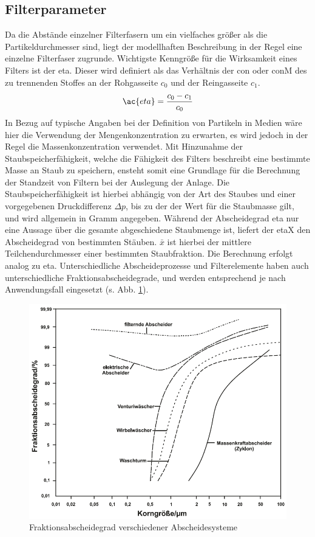 \subsection{Filterparameter}
Da die Abstände einzelner Filterfasern um ein vielfaches größer als die Partikeldurchmesser sind, liegt der modellhaften Beschreibung in der Regel eine einzelne Filterfaser zugrunde.
Wichtigste Kenngröße für die Wirksamkeit eines Filters ist der \ac{eta}.  Dieser wird definiert als das Verhältnis der \ac{con} oder \ac{conM} des zu trennenden Stoffes an der Rohgasseite $c_0$ und der Reingasseite $c_1$.\cite{Staubabscheidung}
\[
\ac{eta} = \frac{c_0 - c_1}{c_0}
\]
In Bezug auf typische Angaben bei der Definition von Partikeln in Medien wäre hier die Verwendung der Mengenkonzentration zu erwarten, es wird jedoch in der Regel die Massenkonzentration verwendet. Mit Hinzunahme der Staubspeicherfähigkeit, welche die Fähigkeit des Filters beschreibt eine bestimmte Masse an Staub zu speichern, ensteht somit eine Grundlage für die Berechnung der Standzeit von Filtern bei der Auslegung der Anlage.
Die Staubspeicherfähigkeit ist hierbei abhängig von der Art des Staubes und einer vorgegebenen Druckdifferenz $\Delta p$, bis zu der der Wert für die Staubmasse gilt, und wird allgemein in Gramm angegeben. \cite{vdi3677_2} \newline
Während der Abscheidegrad \ac{eta} nur eine Aussage über die gesamte abgeschiedene Staubmenge ist, liefert der \ac{etaX} den Abscheidegrad von bestimmten Stäuben. \ensuremath{\bar x} ist hierbei der mittlere Teilchendurchmesser einer bestimmten Staubfraktion. Die Berechnung erfolgt analog zu \ac{eta}. \cite{immission} Unterschiedliche Abscheideprozesse und Filterelemente haben auch unterschiedliche Fraktionsabscheidegrade, und werden entsprechend je nach Anwendungsfall eingesetzt (s. Abb. \ref{fi:frak_filter}).
\begin{figure}[H]
    \begin{center}
        \includegraphics[width=\linewidth]{images/frak_filter.png}
        \caption[Fraktionsabscheidegrad verschiedener Abscheidesysteme]{Fraktionsabscheidegrad verschiedener Abscheidesysteme \cite{frak_filter} }
        \label{fi:frak_filter}
    \end{center}
\end{figure}
